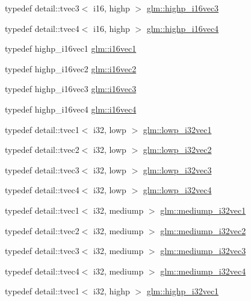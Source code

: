 \begin{CompactItemize}
\item 
typedef detail::tvec3$<$ i16, highp $>$ \hyperlink{group__gtc__type__precision_g8dcfd412bd9ce99a1cf5c2b6e50f07e7}{glm::highp\_\-i16vec3}
\item 
typedef detail::tvec4$<$ i16, highp $>$ \hyperlink{group__gtc__type__precision_g7fd6f1b3c224833cc330a2c64b6994dd}{glm::highp\_\-i16vec4}
\item 
typedef highp\_\-i16vec1 \hyperlink{group__gtc__type__precision_ga3a2fe05ca6a7086c5580922ebda4bf3}{glm::i16vec1}
\item 
typedef highp\_\-i16vec2 \hyperlink{group__gtc__type__precision_g13f7a88281faec6a72231dce73ce6129}{glm::i16vec2}
\item 
typedef highp\_\-i16vec3 \hyperlink{group__gtc__type__precision_g22ec113d49837ef823048bb01511564c}{glm::i16vec3}
\item 
typedef highp\_\-i16vec4 \hyperlink{group__gtc__type__precision_g28cd96ac55e2209bdbd3a41cb8af970a}{glm::i16vec4}
\item 
typedef detail::tvec1$<$ i32, lowp $>$ \hyperlink{group__gtc__type__precision_gdb82f1c8a0f4d3304862d32079961974}{glm::lowp\_\-i32vec1}
\item 
typedef detail::tvec2$<$ i32, lowp $>$ \hyperlink{group__gtc__type__precision_g1ac855a9b4ef24908d00ab715e7ddbff}{glm::lowp\_\-i32vec2}
\item 
typedef detail::tvec3$<$ i32, lowp $>$ \hyperlink{group__gtc__type__precision_ga4a0dd64d4253a3641225254670c7b95}{glm::lowp\_\-i32vec3}
\item 
typedef detail::tvec4$<$ i32, lowp $>$ \hyperlink{group__gtc__type__precision_g99adefeda08a56345b0553d13283d2fa}{glm::lowp\_\-i32vec4}
\item 
typedef detail::tvec1$<$ i32, mediump $>$ \hyperlink{group__gtc__type__precision_g44c6a3b78e635d91e35e1c41ab6b0ba1}{glm::mediump\_\-i32vec1}
\item 
typedef detail::tvec2$<$ i32, mediump $>$ \hyperlink{group__gtc__type__precision_gef7b37956ce9e1cc4faecf21b7fdae8b}{glm::mediump\_\-i32vec2}
\item 
typedef detail::tvec3$<$ i32, mediump $>$ \hyperlink{group__gtc__type__precision_g768e62b66086bd85a438341eedfad651}{glm::mediump\_\-i32vec3}
\item 
typedef detail::tvec4$<$ i32, mediump $>$ \hyperlink{group__gtc__type__precision_g68126328090f37655d8218c5a5fb8ae5}{glm::mediump\_\-i32vec4}
\item 
typedef detail::tvec1$<$ i32, highp $>$ \hyperlink{group__gtc__type__precision_gdcd58130a48fa561e784a135a88c5d6e}{glm::highp\_\-i32vec1}

\end{CompactItemize}
